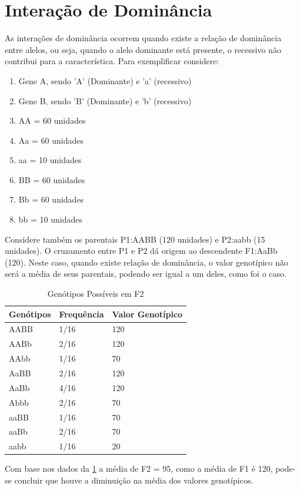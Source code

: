\section{Interação de Dominância}

As interações de dominância ocorrem quando existe a relação de dominância entre alelos, ou seja, quando o alelo dominante está presente, o recessivo não contribui para a característica. Para exemplificar considere:

\begin{enumerate}
\item Gene A, sendo 'A' (Dominante) e 'a' (recessivo)
\item Gene B, sendo 'B' (Dominante) e 'b' (recessivo)
\item AA = 60 unidades
\item Aa = 60 unidades
\item aa = 10 unidades
\item BB = 60 unidades
\item Bb = 60 unidades
\item bb = 10 unidades
\end{enumerate}

Considere também os parentais P1:AABB (120 unidades) e P2:aabb (15 unidades). O cruzamento entre P1 e P2 dá origem ao descendente F1:AaBb (120). Neste caso, quando existe relação de dominância, o valor genotípico não será a média de seus parentais, podendo ser igual a um deles, como foi o caso.


\begin{table}[h]
\centering
\begin{tabular}{l l l}
\toprule
 \textbf{Genótipos} & \textbf{Frequência} & \textbf{Valor Genotípico}\\
\midrule
 AABB & 1/16 & 120 \\
 AABb & 2/16 & 120 \\
 AAbb & 1/16 & 70  \\
 AaBB & 2/16 & 120 \\
 AaBb & 4/16 & 120 \\
 Abbb & 2/16 & 70  \\
 aaBB & 1/16 & 70  \\
 aaBb & 2/16 & 70  \\
 aabb & 1/16 & 20  \\
\bottomrule
\end{tabular}
\caption{Genótipos Possíveis em F2} \label{tab:t03}
\end{table}

Com base nos dados da \ref{tab:t03} a média de F2 = 95, como a média de F1 é 120, pode-se concluir que houve a diminuição na média dos valores genotípicos. 

